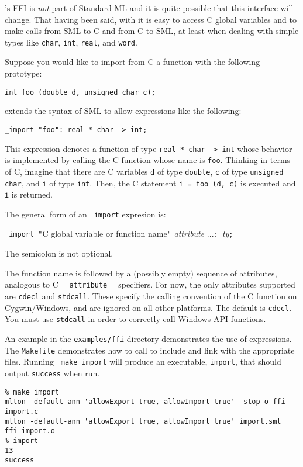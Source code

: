 %
{\mlton}'s FFI is {\em not} part of Standard ML and it is quite
possible that this interface will change.  That having been said, with
{\mlton} it is easy to access C global variables and to make calls
from SML to C and from C to SML, at least when dealing with simple
types like {\tt char}, {\tt int}, {\tt real}, and {\tt word}.
%

Suppose you would like to import from C a function with the following
prototype:
\begin{verbatim}
int foo (double d, unsigned char c);
\end{verbatim}
{\mlton} extends the syntax of SML to allow expressions like the following:
\begin{verbatim}
_import "foo": real * char -> int;
\end{verbatim}
This expression denotes a function of type {\tt real * char -> int}
whose behavior is implemented by calling the C function whose name is
{\tt foo}.  Thinking in terms of C, imagine that there are C
variables {\tt d} of type {\tt double}, {\tt c} of type {\tt unsigned
char}, and {\tt i} of type {\tt int}.  Then, the C statement
\mbox{\tt i = foo (d, c)} is executed and {\tt i} is returned.

The general form of an \verb+_import+ expresion is:
\begin{center}
{\tt \_import "}C global variable or function name{\tt "} 
{\it attribute} ...{\tt : }{\it ty}{\tt ;}
\end{center}
The semicolon is not optional.

The function name is followed by a (possibly empty) sequence of
attributes, analogous to C {\tt\_\_attribute\_\_} specifiers.  For
now, the only attributes supported are {\tt cdecl} and {\tt stdcall}.
These specify the calling convention of the C function on
Cygwin/Windows, and are ignored on all other platforms.  The default
is {\tt cdecl}.  You must use {\tt stdcall} in order to correctly call
Windows API functions.

An example in the {\tt examples/ffi} directory demonstrates the use of
{} expressions.  The {\tt Makefile} demonstrates how to call
{\mlton} to include and link with the appropriate files.  Running {\tt
make import} will produce an executable, {\tt import}, that should
output {\tt success} when run.

\begin{verbatim}
% make import
mlton -default-ann 'allowExport true, allowImport true' -stop o ffi-import.c
mlton -default-ann 'allowExport true, allowImport true' import.sml ffi-import.o
% import
13
success
\end{verbatim}

